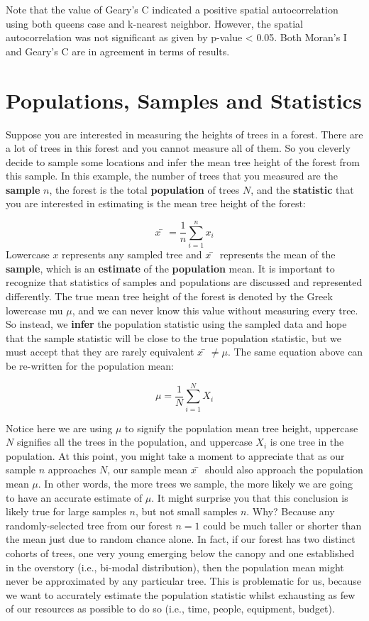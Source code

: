 \documentclass[
]{book}
\begin{document}
Note that the value of Geary's C indicated a positive spatial autocorrelation using both queens case and k-nearest neighbor. However, the spatial autocorrelation was not significant as given by p-value \textless{} 0.05. Both Moran's I and Geary's C are in agreement in terms of results.

\hypertarget{populations-samples-and-statistics}{%
\section{Populations, Samples and Statistics}\label{populations-samples-and-statistics}}

Suppose you are interested in measuring the heights of trees in a forest. There are a lot of trees in this forest and you cannot measure all of them. So you cleverly decide to sample some locations and infer the mean tree height of the forest from this sample. In this example, the number of trees that you measured are the \textbf{sample} \(n\), the forest is the total \textbf{population} of trees \(N\), and the \textbf{statistic} that you are interested in estimating is the mean tree height of the forest:

\[
x̄ = \frac{1}{n} \sum_{i=1}^{n} x_i
\]
Lowercase \(x\) represents any sampled tree and \(x̄\) represents the mean of the \textbf{sample}, which is an \textbf{estimate} of the \textbf{population} mean. It is important to recognize that statistics of samples and populations are discussed and represented differently. The true mean tree height of the forest is denoted by the Greek lowercase mu \(μ\), and we can never know this value without measuring every tree. So instead, we \textbf{infer} the population statistic using the sampled data and hope that the sample statistic will be close to the true population statistic, but we must accept that they are rarely equivalent \(x̄≠μ\). The same equation above can be re-written for the population mean:

\[
μ = \frac{1}{N} \sum_{i=1}^{N} X_i
\]

Notice here we are using \(μ\) to signify the population mean tree height, uppercase \(N\) signifies all the trees in the population, and uppercase \(X_i\) is one tree in the population. At this point, you might take a moment to appreciate that as our sample \(n\) approaches \(N\), our sample mean \(x̄\) should also approach the population mean \(μ\). In other words, the more trees we sample, the more likely we are going to have an accurate estimate of \(μ\). It might surprise you that this conclusion is likely true for large samples \(n\), but not small samples \(n\). Why? Because any randomly-selected tree from our forest \(n=1\) could be much taller or shorter than the mean just due to random chance alone. In fact, if our forest has two distinct cohorts of trees, one very young emerging below the canopy and one established in the overstory (i.e., bi-modal distribution), then the population mean might never be approximated by any particular tree. This is problematic for us, because we want to accurately estimate the population statistic whilst exhausting as few of our resources as possible to do so (i.e., time, people, equipment, budget).
\end{document}
